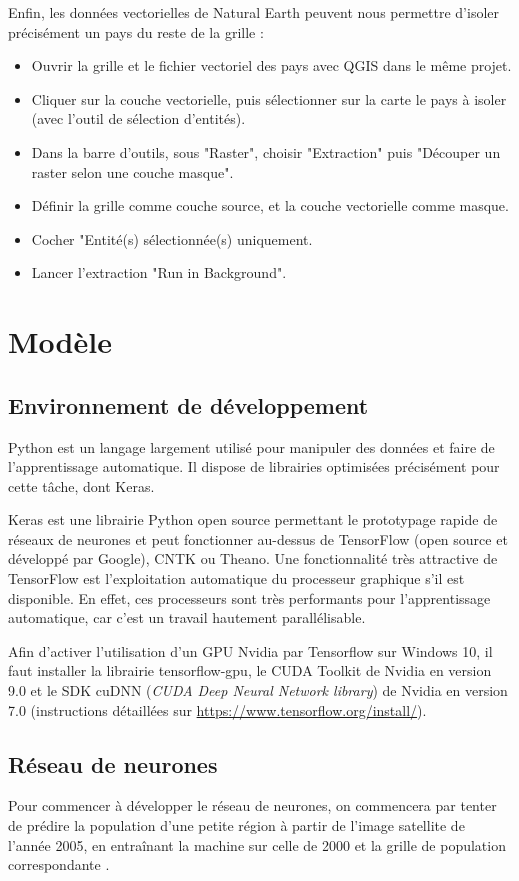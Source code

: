 \documentclass[a4paper, 11pt]{report}
\begin{document}
Enfin, les données vectorielles de Natural Earth \cite{naturalearthdata} peuvent nous permettre d'isoler précisément un pays du reste de la grille :
\begin{itemize}
	\item Ouvrir la grille et le fichier vectoriel des pays avec QGIS dans le même projet.
	\item Cliquer sur la couche vectorielle, puis sélectionner sur la carte le pays à isoler (avec l'outil de sélection d'entités).
	\item Dans la barre d'outils, sous "Raster", choisir "Extraction" puis "Découper un raster selon une couche masque".
	\item Définir la grille comme couche source, et la couche vectorielle comme masque.
	\item Cocher "Entité(s) sélectionnée(s) uniquement.
	\item Lancer l'extraction "Run in Background".
\end{itemize}

\chapter{Modèle}
\section{Environnement de développement}
Python est un langage largement utilisé pour manipuler des données et faire de l'apprentissage automatique. Il dispose de librairies optimisées précisément pour cette tâche, dont Keras.

Keras est une librairie Python open source permettant le prototypage rapide de réseaux de neurones et peut fonctionner au-dessus de TensorFlow (open source et développé par Google), CNTK ou Theano. Une fonctionnalité très attractive de TensorFlow est l'exploitation automatique du processeur graphique s'il est disponible. En effet, ces processeurs sont très performants pour l'apprentissage automatique, car c'est un travail hautement parallélisable.

Afin d'activer l'utilisation d'un GPU Nvidia par Tensorflow sur Windows 10, il faut installer la librairie tensorflow-gpu, le CUDA Toolkit de Nvidia en version 9.0 et le SDK cuDNN (\textit{CUDA Deep Neural Network library}) de Nvidia en version 7.0 (instructions détaillées sur \url{https://www.tensorflow.org/install/}).

\section{Réseau de neurones}
Pour commencer à développer le réseau de neurones, on commencera par tenter de prédire la population d'une petite région à partir de l'image satellite de l'année 2005, en entraînant la machine sur celle de 2000 \cite{noaa} et la grille de population correspondante \cite{sedac}.
\end{document}
